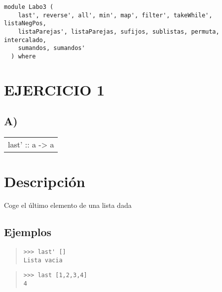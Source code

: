 \label{module:Labo3}
\haddockbeginheader
{\haddockverb\begin{verbatim}
module Labo3 (
    last', reverse', all', min', map', filter', takeWhile', listaNegPos,
    listaParejas', listaParejas, sufijos, sublistas, permuta, intercalado,
    sumandos, sumandos'
  ) where\end{verbatim}}
\haddockendheader

\section{EJERCICIO 1}
\subsection{A)}
\begin{haddockdesc}
\item[\begin{tabular}{@{}l}
last' :: {\char 91}a{\char 93} -> a
\end{tabular}]
{\haddockbegindoc
\section*{Descripción}
Coge el último elemento de una lista dada\par
\subsection*{Ejemplos}
\begin{quote}
{\haddockverb\begin{verbatim}
>>> last' []
Lista vacia

\end{verbatim}}
\end{quote}
\begin{quote}
{\haddockverb\begin{verbatim}
>>> last [1,2,3,4]
4

\end{verbatim}}
\end{quote}}
\end{haddockdesc}
